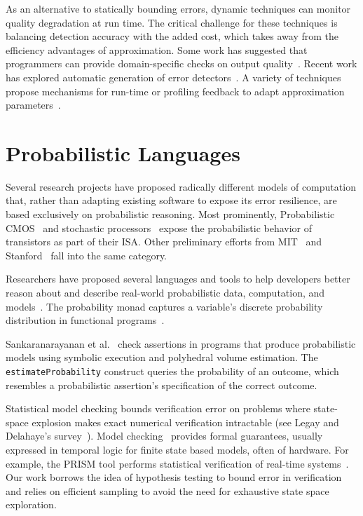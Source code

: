 As an alternative to statically bounding errors, dynamic techniques can
monitor quality degradation at run time.
The critical challenge for these techniques is balancing detection accuracy
with the added cost, which takes away from the efficiency advantages of
approximation.
Some work has suggested that programmers can provide domain-specific checks on
output quality~\cite{lwc, approxdebug}.
Recent work has explored automatic generation of error detectors~\cite{rumba}.
A variety of techniques propose mechanisms for run-time or profiling feedback to adapt
approximation parameters~\cite{dynamicknobs, green, approxit, ansel-autotuning}.


\section{Probabilistic Languages}


Several research projects have proposed radically different models of
computation that, rather than adapting existing software to expose its error
resilience, are based exclusively on probabilistic reasoning. Most
prominently, Probabilistic CMOS~\cite{pcmos, pcmos-cacm, palem-dac-position}
and stochastic processors~\cite{stochasticproc, storm} expose the probabilistic
behavior of transistors as part of their ISA.
Other preliminary efforts from MIT~\cite{batesmit, lyric, mansinghka-circuits} and
Stanford~\cite{ersa} fall into the same category.

Researchers have proposed several languages and tools to
help developers better reason about and describe real-world
probabilistic data, computation, and models~\cite{BBGR13,
  wingate-lightweight, church, chaganty, pfeffersample, pmonad,
  infernet, probdsl,uncertaint}.
The probability monad captures a variable's discrete probability
distribution in functional programs~\cite{pmonad}.

Sankaranarayanan et al.~\cite{sriram-pldi} check assertions in
programs that produce probabilistic models using symbolic execution
and polyhedral volume estimation. The \texttt{estimateProbability} construct
queries the probability of an outcome, which resembles a probabilistic
assertion's
specification of the correct outcome.

Statistical model checking bounds verification error on
problems where state-space explosion makes exact numerical
verification intractable (see Legay and Delahaye's
survey~\cite{legay10}).  Model checking~\cite{Clarke} provides formal guarantees,
usually expressed in temporal logic for finite state
based models, often of hardware. For example, the
PRISM tool performs statistical verification of real-time
systems~\cite{KNP11}. Our work borrows the idea of hypothesis
testing to bound error in verification~\cite{Younes,Younes20061368}
and
relies on efficient sampling to avoid
the need for exhaustive state space exploration.

